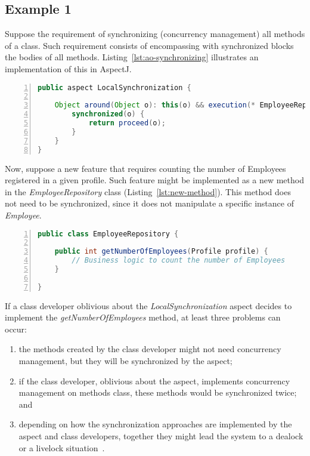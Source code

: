\subsection{Example 1}

Suppose the requirement of synchronizing (concurrency management)
all methods of a class. Such requirement consists of encompassing
with synchronized blocks the bodies of all methods.
Listing~\ref{lst:ao-synchronizing} illustrates an implementation of
this in AspectJ.

\scriptsize
\begin{lstlisting}[frame=single, caption={Concurrency concern tangled and scattered in EmployeeRepository.},label=lst:ao-synchronizing, numbers=left, language=Java]
public aspect LocalSynchronization {

    Object around(Object o): this(o) && execution(* EmployeeRepository.*(..)) {
        synchronized(o) {
            return proceed(o);
        }
    }
}
\end{lstlisting}
\normalsize

Now, suppose a new feature that requires counting the number of
Employees registered in a given profile. Such feature might be
implemented as a new method in the \emph{EmployeeRepository} class
(Listing~\ref{lst:new-method}). This method does not need to be
synchronized, since it does not manipulate a specific instance of
\emph{Employee}.

\scriptsize
\begin{lstlisting}[frame=single, caption={A new method for counting the number of Employees.},label=lst:new-method, numbers=left, language=Java]
public class EmployeeRepository {

    public int getNumberOfEmployees(Profile profile) {
        // Business logic to count the number of Employees
    }

}
\end{lstlisting}
\normalsize

If a class developer oblivious about the \emph{LocalSynchronization}
aspect decides to implement the \emph{getNumberOfEmployees} method,
at least three problems can occur:


\begin{enumerate}

    \item the methods created by the class developer might not need concurrency management,
    but they will be synchronized by the aspect;

    \item if the class developer, oblivious about the aspect,
    implements concurrency management on methods class, these methods
    would be synchronized twice; and

    \item depending on how the synchronization approaches are implemented
    by the aspect and class developers, together they might lead the system
    to a dealock or a livelock situation~\cite{lea-java-coop-1999}.

\end{enumerate}

